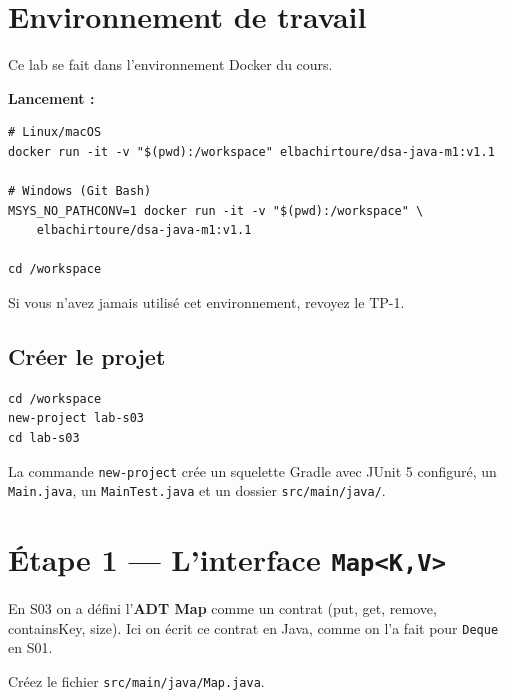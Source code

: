 \documentclass[11pt,a4paper]{article}
\begin{document}
\section{Environnement de travail}

\begin{infobox}
Ce lab se fait dans l'environnement Docker du cours.

\textbf{Lancement :}
\begin{verbatim}
# Linux/macOS
docker run -it -v "$(pwd):/workspace" elbachirtoure/dsa-java-m1:v1.1

# Windows (Git Bash)
MSYS_NO_PATHCONV=1 docker run -it -v "$(pwd):/workspace" \
    elbachirtoure/dsa-java-m1:v1.1

cd /workspace
\end{verbatim}

Si vous n'avez jamais utilisé cet environnement, revoyez le TP-1.
\end{infobox}

\subsection{Créer le projet}

\begin{lstlisting}[style=bash]
cd /workspace
new-project lab-s03
cd lab-s03
\end{lstlisting}

La commande \texttt{new-project} crée un squelette Gradle avec JUnit 5 configuré, un \texttt{Main.java}, un \texttt{MainTest.java} et un dossier \texttt{src/main/java/}.

\section{Étape 1 --- L'interface \texttt{Map<K,V>}}

\begin{lienbox}[Ce qu'on matérialise du CM]
En S03 on a défini l'\textbf{ADT Map} comme un contrat (put, get, remove, containsKey, size). Ici on écrit ce contrat en Java, comme on l'a fait pour \texttt{Deque} en S01.
\end{lienbox}

Créez le fichier \texttt{src/main/java/Map.java}.
\end{document}
